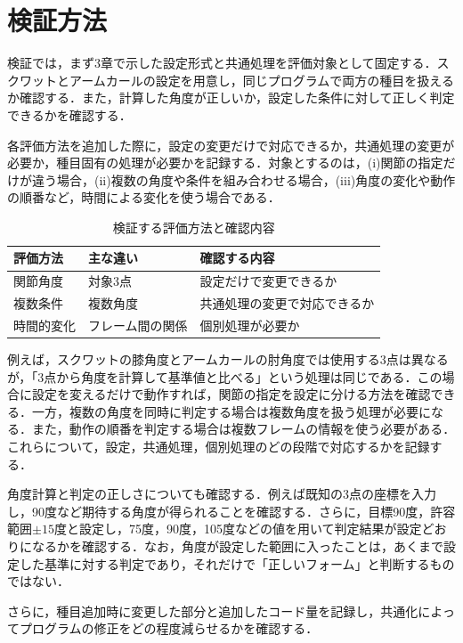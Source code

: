 \documentclass[no-page-number]{nanzan-abstract}
\begin{document}
\section{検証方法}

検証では，まず3章で示した設定形式と共通処理を評価対象として固定する．スクワットとアームカールの設定を用意し，同じプログラムで両方の種目を扱えるか確認する．また，計算した角度が正しいか，設定した条件に対して正しく判定できるかを確認する．

各評価方法を追加した際に，設定の変更だけで対応できるか，共通処理の変更が必要か，種目固有の処理が必要かを記録する．対象とするのは，(i)関節の指定だけが違う場合，(ii)複数の角度や条件を組み合わせる場合，(iii)角度の変化や動作の順番など，時間による変化を使う場合である．

\begin{table}[t]
\centering
\caption{検証する評価方法と確認内容}
\small
\begin{tabular}{p{}p{}p{}}
\toprule
評価方法 & 主な違い & 確認する内容\\
\midrule
関節角度 & 対象3点 & 設定だけで変更できるか\\
複数条件 & 複数角度 & 共通処理の変更で対応できるか\\
時間的変化 & フレーム間の関係 & 個別処理が必要か\\
\bottomrule
\end{tabular}
\end{table}

例えば，スクワットの膝角度とアームカールの肘角度では使用する3点は異なるが，「3点から角度を計算して基準値と比べる」という処理は同じである．この場合に設定を変えるだけで動作すれば，関節の指定を設定に分ける方法を確認できる．一方，複数の角度を同時に判定する場合は複数角度を扱う処理が必要になる．また，動作の順番を判定する場合は複数フレームの情報を使う必要がある．これらについて，設定，共通処理，個別処理のどの段階で対応するかを記録する．

角度計算と判定の正しさについても確認する．例えば既知の3点の座標を入力し，90度など期待する角度が得られることを確認する．さらに，目標90度，許容範囲$\pm15$度と設定し，75度，90度，105度などの値を用いて判定結果が設定どおりになるかを確認する．なお，角度が設定した範囲に入ったことは，あくまで設定した基準に対する判定であり，それだけで「正しいフォーム」と判断するものではない．

さらに，種目追加時に変更した部分と追加したコード量を記録し，共通化によってプログラムの修正をどの程度減らせるかを確認する．
\end{document}
